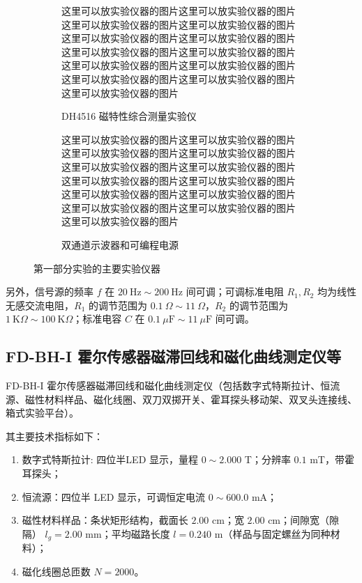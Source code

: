 \documentclass[UTF8]{article}
\def\kO{\ \mathrm{K}\Omega}
\def\uF{\ \mu\mathrm{F}}
\theoremstyle{MyLineTheoremStyle} %
\theoremstyle{MyBlockTheoremStyle} %
\theoremstyle{MySubsubsectionStyle} %
\begin{document}
\begin{figure}[H]\centering
\begin{subfigure}[b]{0.48\columnwidth}\centering
    这里可以放实验仪器的图片这里可以放实验仪器的图片这里可以放实验仪器的图片这里可以放实验仪器的图片这里可以放实验仪器的图片这里可以放实验仪器的图片这里可以放实验仪器的图片这里可以放实验仪器的图片这里可以放实验仪器的图片这里可以放实验仪器的图片这里可以放实验仪器的图片这里可以放实验仪器的图片这里可以放实验仪器的图片
    \caption{DH4516 磁特性综合测量实验仪}
\end{subfigure}\hfill
\begin{subfigure}[b]{0.48\columnwidth}\centering
    这里可以放实验仪器的图片这里可以放实验仪器的图片这里可以放实验仪器的图片这里可以放实验仪器的图片这里可以放实验仪器的图片这里可以放实验仪器的图片这里可以放实验仪器的图片这里可以放实验仪器的图片这里可以放实验仪器的图片这里可以放实验仪器的图片这里可以放实验仪器的图片这里可以放实验仪器的图片这里可以放实验仪器的图片
    \caption{双通道示波器和可编程电源}
\end{subfigure}
\caption{第一部分实验的主要实验仪器}
\end{figure}

另外，信号源的频率 $f$ 在 $ 20\ \mathrm{Hz} \sim 200\ \mathrm{Hz} $ 间可调；可调标准电阻 $ R_1,R_2 $ 均为线性无感交流电阻，$ R_1 $ 的调节范围为 $ 0.1 \ \Omega \sim 11\ \Omega $，$ R_2 $ 的调节范围为 $ 1 \kO \sim 100 \kO $；标准电容 $C$ 在 $ 0.1 \uF \sim 11 \uF $ 间可调。

\subsection{FD-BH-I 霍尔传感器磁滞回线和磁化曲线测定仪等}

FD-BH-I 霍尔传感器磁滞回线和磁化曲线测定仪（包括数字式特斯拉计、恒流源、磁性材料样品、磁化线圈、双刀双掷开关、霍耳探头移动架、双叉头连接线、箱式实验平台）。

其主要技术指标如下：
\begin{enumerate}
\item 数字式特斯拉计: 四位半LED 显示，量程 $0 \sim 2.000 $ T；分辨率 $0.1$ mT，带霍耳探头；
\item 恒流源：四位半 LED 显示，可调恒定电流 $0\sim 600.0$ mA；
\item 磁性材料样品：条状矩形结构，截面长 $2.00$ cm；宽 $2.00$ cm；间隙宽（隙隔） $l_g = 2.00$ mm；平均磁路长度 $l =0.240$ m（样品与固定螺丝为同种材料）；
\item 磁化线圈总匝数 $N=2000$。
\end{enumerate}
\end{document}
